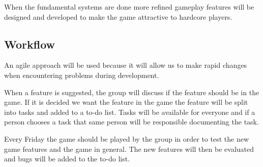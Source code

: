 When the fundamental systems are done more refined gameplay features will be designed and developed to make the game attractive to hardcore players.

\subsection{Workflow}
An agile approach will be used because it will allow us to make rapid changes when encountering problems during development.

When a feature is suggested, the group will discuss if the feature should be in the game.
If it is decided we want the feature in the game the feature will be split into tasks and added to a to-do list.
Tasks will be available for everyone and if a person chooses a task that same person will be responsible documenting the task.

Every Friday the game should be played by the group in order to test the new game features and the game in general.
The new features will then be evaluated and bugs will be added to the to-do list.
